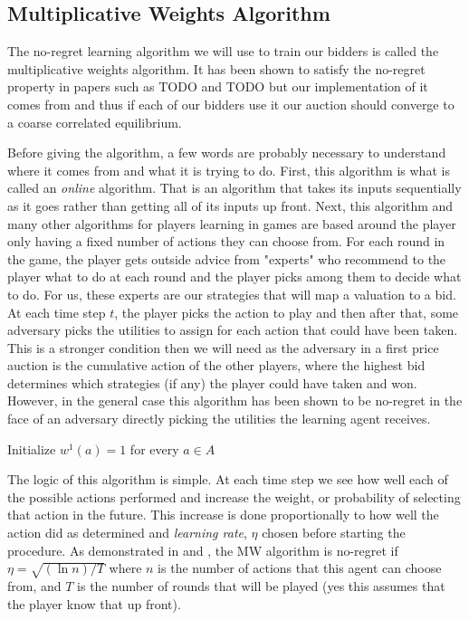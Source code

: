 \documentclass[12pt,twoside]{reedthesis}
\begin{document}
\subsection{Multiplicative Weights Algorithm}
The no-regret learning algorithm we will use to train our bidders is called the multiplicative weights algorithm. It has been shown to satisfy the no-regret property in papers such as TODO and TODO but our implementation of it comes from \cite{Roughgarden2016} and thus if each of our bidders use it our auction should converge to a coarse correlated equilibrium. 

Before giving the algorithm, a few words are probably necessary to understand where it comes from and what it is trying to do. First, this algorithm is what is called an \textit{online} algorithm. That is an algorithm that takes its inputs sequentially as it goes rather than getting all of its inputs up front. Next, this algorithm and many other algorithms for players learning in games are based around the player only having a fixed number of actions they can choose from. For each round in the game, the player gets outside advice from "experts" who recommend to the player what to do at each round and the player picks among them to decide what to do. For us, these experts are our strategies that will map a valuation to a bid. At each time step $t$, the player picks the action to play and then after that, some adversary picks the utilities to assign for each action that could have been taken. This is a stronger condition then we will need as the adversary in a first price auction is the cumulative action of the other players, where the highest bid determines which strategies (if any) the player could have taken and won. However, in the general case this algorithm has been shown to be no-regret in the face of an adversary directly picking the utilities the learning agent receives.\\

\begin{algorithm}[H]
	Initialize $w^1(a) = 1$ for every $a\in A$\\
\end{algorithm}
\vspace{1cm}
The logic of this algorithm is simple. At each time step we see how well each of the possible actions performed and increase the weight, or probability of selecting that action in the future. This increase is done proportionally to how well the action did as determined and \textit{learning rate}, $\eta$ chosen before starting the procedure. As demonstrated in \cite{Roughgarden} and \cite{Blum2007}, the MW algorithm is no-regret if $\eta = \sqrt{(\ln n) / T}$ where $n$ is the number of actions that this agent can choose from, and $T$ is the number of rounds that will be played (yes this assumes that the player know that up front).
\end{document}
